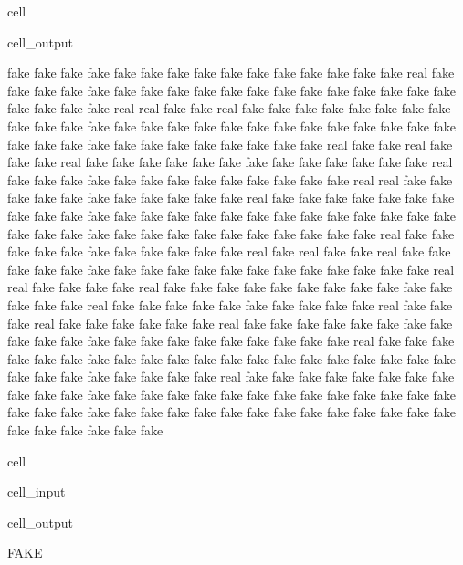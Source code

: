 \documentclass[letterpaper,10pt,brazil]{sphinxmanual}
\begin{document}
\begin{sphinxuseclass}{cell}
\begin{sphinxuseclass}{cell_output}
\begin{sphinxVerbatim}[commandchars=\\\{\}]
fake
fake
fake
fake
fake
fake
fake
fake
fake
fake
fake
fake
fake
fake
fake
real
fake
fake
fake
fake
fake
fake
fake
fake
fake
fake
fake
fake
fake
fake
fake
fake
fake
fake
fake
fake
fake
fake
real
real
fake
fake
real
fake
fake
fake
fake
fake
fake
fake
fake
fake
fake
fake
fake
fake
fake
fake
fake
fake
fake
fake
fake
fake
fake
fake
fake
fake
fake
fake
fake
fake
fake
fake
fake
fake
fake
fake
fake
fake
real
fake
fake
real
fake
fake
fake
real
fake
fake
fake
fake
fake
fake
fake
fake
fake
fake
fake
fake
fake
real
fake
fake
fake
fake
fake
fake
fake
fake
fake
fake
fake
fake
fake
real
real
fake
fake
fake
fake
fake
fake
fake
fake
fake
fake
fake
real
fake
fake
fake
fake
fake
fake
fake
fake
fake
fake
fake
fake
fake
fake
fake
fake
fake
fake
fake
fake
fake
fake
fake
fake
fake
fake
fake
fake
fake
fake
fake
fake
fake
fake
fake
fake
fake
fake
real
fake
fake
fake
fake
fake
fake
fake
fake
fake
fake
fake
real
fake
real
fake
fake
real
fake
fake
fake
fake
fake
fake
fake
fake
fake
fake
fake
fake
fake
fake
fake
fake
fake
fake
real
real
fake
fake
fake
fake
real
fake
fake
fake
fake
fake
fake
fake
fake
fake
fake
fake
fake
fake
fake
real
fake
fake
fake
fake
fake
fake
fake
fake
fake
fake
real
fake
fake
fake
real
fake
fake
fake
fake
fake
fake
real
fake
fake
fake
fake
fake
fake
fake
fake
fake
fake
fake
fake
fake
fake
fake
fake
fake
fake
fake
fake
fake
real
fake
fake
fake
fake
fake
fake
fake
fake
fake
fake
fake
fake
fake
fake
fake
fake
fake
fake
fake
fake
fake
fake
fake
fake
fake
fake
fake
fake
real
fake
fake
fake
fake
fake
fake
fake
fake
fake
fake
fake
fake
fake
fake
fake
fake
fake
fake
fake
fake
fake
fake
fake
fake
fake
fake
fake
fake
fake
fake
fake
fake
fake
fake
fake
fake
fake
fake
fake
fake
fake
fake
fake
fake
fake
fake
fake
fake
\end{sphinxVerbatim}

\end{sphinxuseclass}
\end{sphinxuseclass}
\begin{sphinxuseclass}{cell}
\begin{sphinxuseclass}{cell_input}
\begin{sphinxVerbatim}[commandchars=\\\{\}]
\PYG{p}{[}\PYG{p}{]}\PYG{p}{[}\PYG{p}{]}
\end{sphinxVerbatim}

\end{sphinxuseclass}
\begin{sphinxuseclass}{cell_output}
\begin{sphinxVerbatim}[commandchars=\\\{\}]
\PYGZsq{}FAKE\PYGZsq{}
\end{sphinxVerbatim}

\end{sphinxuseclass}
\end{sphinxuseclass}
\sphinxstepscope
\end{document}
